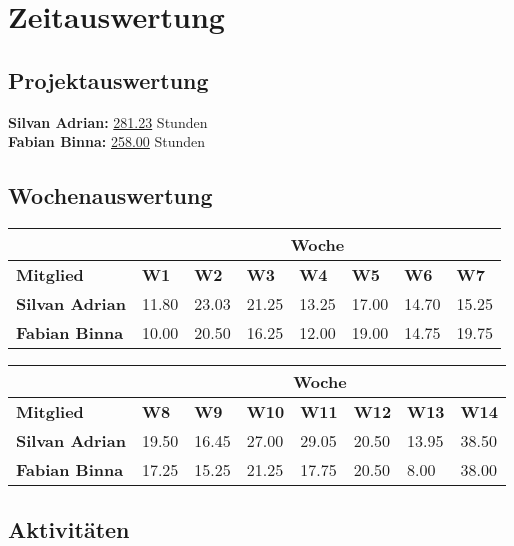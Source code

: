 \chapter{Zeitauswertung}

\section{Projektauswertung}

\textbf{Silvan Adrian:} \underline{281.23} Stunden
\\
\textbf{Fabian Binna:} \underline{258.00} Stunden

\section{Wochenauswertung}

\begin{table}[h]
\begin{tabularx}{\linewidth}{l X X X X X X X}
& \multicolumn{7}{c}{\textbf{Woche}}\\
\hline
\textbf{Mitglied} & \textbf{W1} & \textbf{W2} & \textbf{W3} & \textbf{W4} & \textbf{W5} & \textbf{W6} & \textbf{W7} \\
\hline
\textbf{Silvan Adrian} & 11.80  & 23.03  & 21.25 & 13.25 & 17.00 & 14.70 & 15.25  \\
\hline
\textbf{Fabian Binna} & 10.00 & 20.50 & 16.25 & 12.00 & 19.00 & 14.75 & 19.75 \\
\end{tabularx}
\end{table}
\begin{table}[h]
\begin{tabularx}{\linewidth}{l X X X X X X X}
 & \multicolumn{7}{c}{\textbf{Woche}}\\
\hline
\textbf{Mitglied} & \textbf{W8} & \textbf{W9} & \textbf{W10} & \textbf{W11} & \textbf{W12} &
 \textbf{W13} & \textbf{W14}\\
\hline
\textbf{Silvan Adrian} & 19.50 & 16.45 & 27.00 & 29.05  & 20.50  & 13.95 & 38.50 \\
\hline
\textbf{Fabian Binna} & 17.25 & 15.25 & 21.25 & 17.75 & 20.50 & 8.00 & 38.00 \\
\end{tabularx}
\end{table}

\section{Aktivitäten}

